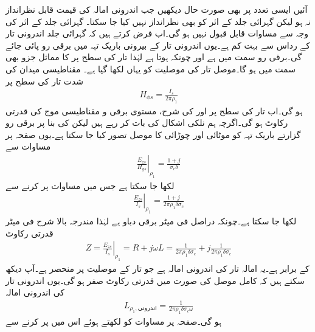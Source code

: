 آئیں ایسی تعدد پر بھی صورت حال دیکھیں جب اندرونی امالہ کی قیمت قابل نظرانداز نہ ہو لیکن گہرائی جلد کے اثر کو بھی نظرانداز نہیں کیا جا سکتا۔ گہرائی جلد کے اثر کی وجہ سے مساوات  قابل قبول نہیں ہو گی۔اب فرض کرتے ہیں کہ گہرائی جلد  اندرونی تار کے رداس  سے بہت کم ہے۔یوں اندرونی تار کے بیرونی باریک تہہ میں برقی رو پائی جائے گی۔برقی رو  سمت میں ہے اور چونکہ  ہوتا ہے لہٰذا تار کی سطح پر  کا مماثل جزو بھی  سمت میں ہو گا۔موصل تار کی موصلیت کو یہاں  لکھا گیا ہے۔ مقناطیسی میدان کی شدت تار کی سطح پر 
\begin{align}\label{مساوات_ترسیلی_ہم_محوری_تار_اندرونی_تار_مقناطیسی_میدان}
H_{\phi s}=\frac{I_s}{2\pi \rho_1}
\end{align}
ہو گی۔اب تار کی سطح پر  اور  کی شرح، مستوی برقی و مقناطیسی موج کی  قدرتی رکاوٹ ہو گی۔اگرچہ ہم نلکی اشکال کی بات کر رہے ہیں لیکن  کی بنا پر برقی رو گزارتے باریک تہہ کو  موٹائی اور  چوڑائی کا موصل تصور کیا جا سکتا ہے۔یوں صفحہ  پر مساوات  سے
\begin{align*}
\left. \frac{E_{zs}}{H_{ys}}\right|_{\rho_1}=\frac{1+j}{\sigma_c \delta}
\end{align*}
لکھا جا سکتا ہے جس میں مساوات  پر کرنے سے
\begin{align*}
\left. \frac{E_{zs}}{I_s} \right|_{\rho_1} =\frac{1+j}{2\pi \rho_1 \delta \sigma_c }
\end{align*}
لکھا جا سکتا ہے۔چونکہ  دراصل فی میٹر برقی دباو ہے لہٰذا مندرجہ بالا شرح فی میٹر قدرتی رکاوٹ
\begin{align}\label{مساوات_ترسیلی_رکاوٹ_بلند_تعدد_ہم_محوری}
Z=\left. \frac{E_{zs}}{I_s} \right|_{\rho_1}=R+j \omega L=\frac{1}{2\pi \rho_1 \delta \sigma_c }+j \frac{1}{2\pi \rho_1 \delta \sigma_c }
\end{align}
 کے برابر ہے۔یہ امالہ تار کی اندرونی امالہ ہے جو تار کے موصلیت  پر منحصر ہے۔آپ دیکھ سکتے ہیں کہ کامل موصل کی صورت میں قدرتی رکاوٹ صفر ہو گی۔یوں اندرونی تار کی اندرونی امالہ
\begin{align*}
L_{\rho_1,\text{اندرونی}}=\frac{1}{2\pi \rho_1 \delta \sigma_c \omega}
\end{align*}
ہو گی۔صفحہ  پر مساوات  کو  لکھتے ہوئے اس میں پر کرنے سے
